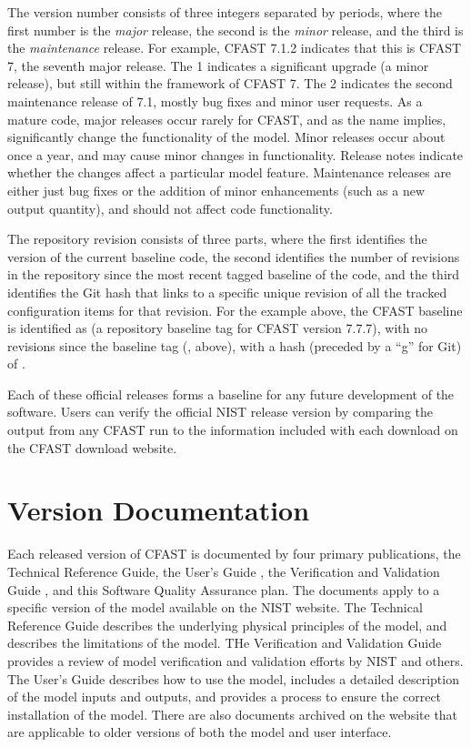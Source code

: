 \documentclass[12pt]{book}
\begin{document}
The version number consists of three integers separated by periods, where the first number is the {\em major} release, the second is the {\em minor} release, and the third is the {\em maintenance} release.   For example, CFAST 7.1.2 indicates that this is CFAST 7, the seventh major release. The 1 indicates a significant upgrade (a minor release), but still within the framework of CFAST 7.  The 2 indicates the second maintenance release of 7.1, mostly bug fixes and minor user requests. As a mature code, major releases occur rarely for CFAST, and as the name implies, significantly change the functionality of the model. Minor releases occur about once a year, and may cause minor changes in functionality. Release notes indicate whether the changes affect a particular model feature. Maintenance releases are either just bug fixes or the addition of minor enhancements (such as a new output quantity), and should not affect code functionality.

The repository revision consists of three parts, where the first identifies the version of the current baseline code, the second identifies the number of revisions in the repository since the most recent tagged baseline of the code, and the third identifies the Git hash that links to a specific unique revision of all the tracked configuration items for that revision. For the example above, the CFAST baseline is identified as  (a repository baseline tag for CFAST version 7.7.7), with no revisions since the baseline tag (, above), with a hash (preceded by a ``g'' for Git) of .

Each of these official releases forms a baseline for any future development of the software. Users can verify the official NIST release version by comparing the output from any CFAST run to the information included with each download on the CFAST download website.

\section{Version Documentation}

Each released version of CFAST is documented by four primary publications, the Technical Reference Guide\cite{CFAST_Tech_Guide_8}, the User's Guide \cite{CFAST_Users_Guide_8}, the Verification and Validation Guide \cite{CFAST_Valid_Guide_8}, and this Software Quality Assurance plan. The documents apply to a specific version of the model available on the NIST website. The Technical Reference Guide describes the underlying physical principles of the model, and describes the limitations of the model. THe Verification and Validation Guide  provides a review of model verification and validation efforts by NIST and others. The User's Guide describes how to use the model, includes a detailed description of the model inputs and outputs, and provides a process to ensure the correct installation of the model. There are also documents archived on the website that are applicable to older versions of both the model and user interface.
\end{document}
